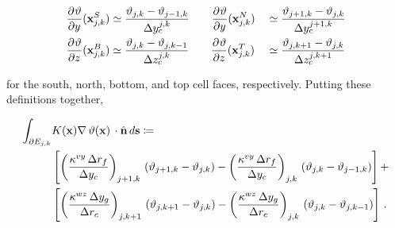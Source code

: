 \begin{linenomath*}\begin{equation*}
    \begin{aligned}
        \frac{\partial^{} {\vartheta}}{\partial {y}^{}}(\mathbf{x}_{j,k}^S)
        &\simeq \dfrac{\vartheta_{j,k} - \vartheta_{j-1,k}}{\Delta y_c^{j,k}}
        \qquad
        \frac{\partial^{} {\vartheta}}{\partial {y}^{}}(\mathbf{x}_{j,k}^N)
        &&\simeq \dfrac{\vartheta_{j+1,k} - \vartheta_{j,k}}{\Delta y_c^{j+1,k}}
        \\
        \frac{\partial^{} {\vartheta}}{\partial {z}^{}}(\mathbf{x}_{j,k}^B)
        &\simeq \dfrac{\vartheta_{j,k} - \vartheta_{j,k-1}}{\Delta z_c^{j,k}}
        \qquad
        \frac{\partial^{} {\vartheta}}{\partial {z}^{}}(\mathbf{x}_{j,k}^T)
        &&\simeq \dfrac{\vartheta_{j,k+1} - \vartheta_{j,k}}{\Delta z_c^{j,k+1}}
    \end{aligned}
\end{equation*}\end{linenomath*}
for the south, north, bottom, and top cell faces, respectively.
Putting these definitions together,
\begin{linenomath}\begin{equation}
    \begin{aligned}
        \int_{\partial E_{j,k}}
        &K(\mathbf{x})\nabla\,\vartheta(\mathbf{x})\,
        \cdot \hat{\mathbf{n}} \, d\mathbf{s}
        \coloneqq \\
        &\left[
            \left(
            \dfrac{\kappa^{vy} \, \Delta r_f}{\Delta y_c}
            \right)_{j+1,k} \,
            (\vartheta_{j+1,k} - \vartheta_{j,k}) -
            \left(
            \dfrac{\kappa^{vy} \, \Delta r_f}{\Delta y_c}
            \right)_{j,k} \,
            (\vartheta_{j,k} - \vartheta_{j-1,k})
        \right]+
        \\
        &\left[
            \left(
            \dfrac{\kappa^{wz} \, \Delta y_g}{\Delta r_c}
            \right)_{j,k+1} \,
            (\vartheta_{j,k+1} - \vartheta_{j,k}) -
            \left(
            \dfrac{\kappa^{wz} \, \Delta y_g}{\Delta r_c}
            \right)_{j,k} \,
            (\vartheta_{j,k} - \vartheta_{j,k-1})
        \right]
        \, .
    \end{aligned}
    \label{eq:big_laplacian}
\end{equation}\end{linenomath}
